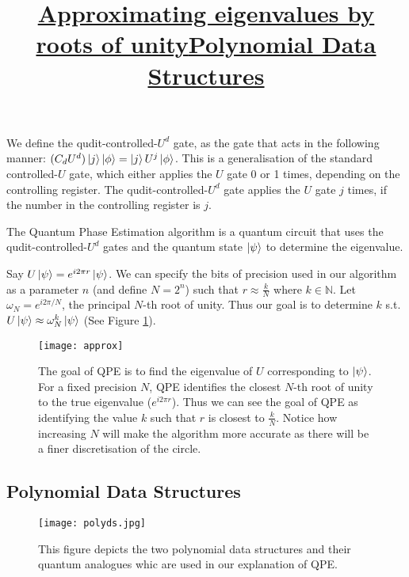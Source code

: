 \documentclass[12pt, a4paper]{article}
\begin{document}
	We define the qudit-controlled-$U^d$ gate, as the gate that acts in the following manner:
	$(C_dU^d) \ket{j}\ket{\phi} = \ket{j}U^j\ket{\phi}$. This is a generalisation of the standard controlled-$U$ gate, which either applies the $U$ gate 0 or 1 times, depending on the controlling register. The qudit-controlled-$U^d$ gate applies the $U$ gate $j$ times, if the number in the controlling register is $j$. 
	
	The Quantum Phase Estimation algorithm is a quantum circuit that uses the qudit-controlled-$U^d$ gates and the quantum state $\ket{\psi}$ to determine the eigenvalue. 
	
	Say $U \ket{\psi} = e^{i 2 \pi r} \ket{\psi}$. We can specify the bits of precision used in our algorithm as a parameter $n$ (and define $N = 2^n$) such that $r \approx \frac{k}{N}$ where $k\in \mathbb{N}$. Let $\omega_N = e^{i 2 \pi /N}$, the principal $N$-th root of unity. Thus our goal is to determine $k$ s.t. $U \ket{\psi} \approx \omega^{k}_N \ket{\psi}$ (See Figure \ref{fig:approx}). 
\begin{figure}
	\centering
	\title{\textbf{\underline{Approximating eigenvalues by roots of unity}}}
	\texttt{[image: approx]}
	\caption{The goal of QPE is to find the eigenvalue of $U$ corresponding to $\ket{\psi}$. For a fixed precision $N$, QPE identifies the closest $N$-th root of unity to the true eigenvalue ($e^{i 2 \pi r}$). Thus we can see the goal of QPE as identifying the value $k$ such that $r$ is closest to $\frac{k}{N}$. Notice how increasing $N$ will make the algorithm more accurate as there will be a finer discretisation of the circle.}
	\label{fig:approx}
\end{figure}
	
	\subsection{Polynomial Data Structures}
	
	\begin{figure}
		\centering
		\title{\textbf{\underline{Polynomial Data Structures}}}
		
		\vspace{5mm}
		\texttt{[image: polyds.jpg]}
		\caption{This figure depicts the two polynomial data structures and their quantum analogues whic are used in our explanation of QPE.}
		\label{fig:polyds}
	\end{figure}
	
	
	
\end{document}
